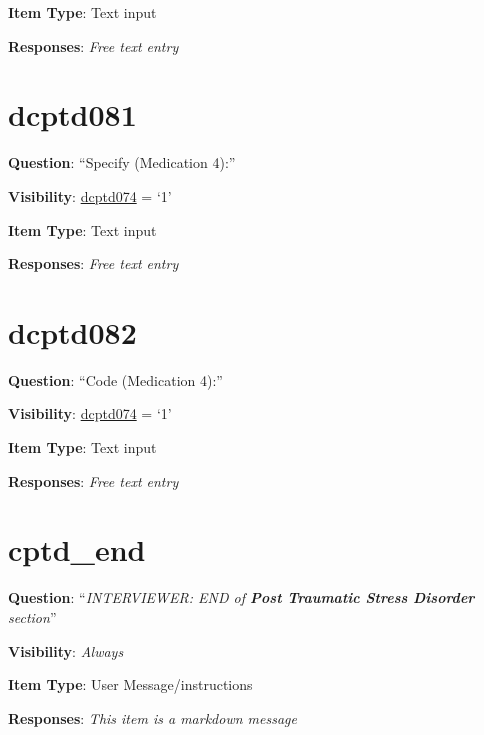 \documentclass[]{book}
\begin{document}
\textbf{Item Type}: Text input

\textbf{Responses}: \emph{Free text entry}

\hypertarget{dcptd081}{%
\section{dcptd081}\label{dcptd081}}

\textbf{Question}: ``Specify (Medication 4):''

\textbf{Visibility}: \protect\hyperlink{dcptd074}{dcptd074} = `1'

\textbf{Item Type}: Text input

\textbf{Responses}: \emph{Free text entry}

\hypertarget{dcptd082}{%
\section{dcptd082}\label{dcptd082}}

\textbf{Question}: ``Code (Medication 4):''

\textbf{Visibility}: \protect\hyperlink{dcptd074}{dcptd074} = `1'

\textbf{Item Type}: Text input

\textbf{Responses}: \emph{Free text entry}

\hypertarget{cptd_end}{%
\section{cptd\_end}\label{cptd_end}}

\textbf{Question}: ``\emph{INTERVIEWER: END of \textbf{Post Traumatic Stress Disorder} section}''

\textbf{Visibility}: \emph{Always}

\textbf{Item Type}: User Message/instructions

\textbf{Responses}: \emph{This item is a markdown message}


\end{document}
